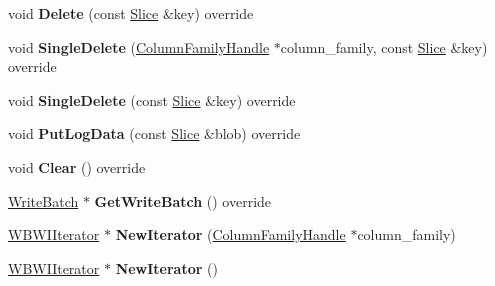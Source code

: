 \begin{DoxyCompactItemize}
\item 
void {\bfseries Delete} (const \hyperlink{classrocksdb_1_1Slice}{Slice} \&key) override\hypertarget{classrocksdb_1_1WriteBatchWithIndex_a8607c3d398eb4be3ecc0b146aa49c414}{}\label{classrocksdb_1_1WriteBatchWithIndex_a8607c3d398eb4be3ecc0b146aa49c414}

\item 
void {\bfseries Single\+Delete} (\hyperlink{classrocksdb_1_1ColumnFamilyHandle}{Column\+Family\+Handle} $\ast$column\+\_\+family, const \hyperlink{classrocksdb_1_1Slice}{Slice} \&key) override\hypertarget{classrocksdb_1_1WriteBatchWithIndex_a0f9e13dde1b941d9048e23a025748e94}{}\label{classrocksdb_1_1WriteBatchWithIndex_a0f9e13dde1b941d9048e23a025748e94}

\item 
void {\bfseries Single\+Delete} (const \hyperlink{classrocksdb_1_1Slice}{Slice} \&key) override\hypertarget{classrocksdb_1_1WriteBatchWithIndex_a5a6a99382308e325ba2331a41a27fec6}{}\label{classrocksdb_1_1WriteBatchWithIndex_a5a6a99382308e325ba2331a41a27fec6}

\item 
void {\bfseries Put\+Log\+Data} (const \hyperlink{classrocksdb_1_1Slice}{Slice} \&blob) override\hypertarget{classrocksdb_1_1WriteBatchWithIndex_a243f29744cb3521f987eb2da0405eff9}{}\label{classrocksdb_1_1WriteBatchWithIndex_a243f29744cb3521f987eb2da0405eff9}

\item 
void {\bfseries Clear} () override\hypertarget{classrocksdb_1_1WriteBatchWithIndex_a35c2f169d06c3965a30b8612640df8d8}{}\label{classrocksdb_1_1WriteBatchWithIndex_a35c2f169d06c3965a30b8612640df8d8}

\item 
\hyperlink{classrocksdb_1_1WriteBatch}{Write\+Batch} $\ast$ {\bfseries Get\+Write\+Batch} () override\hypertarget{classrocksdb_1_1WriteBatchWithIndex_a0e1a019e009b31c5a25388c4dc7ebfdc}{}\label{classrocksdb_1_1WriteBatchWithIndex_a0e1a019e009b31c5a25388c4dc7ebfdc}

\item 
\hyperlink{classrocksdb_1_1WBWIIterator}{W\+B\+W\+I\+Iterator} $\ast$ {\bfseries New\+Iterator} (\hyperlink{classrocksdb_1_1ColumnFamilyHandle}{Column\+Family\+Handle} $\ast$column\+\_\+family)\hypertarget{classrocksdb_1_1WriteBatchWithIndex_a78b9a2d037cbfc2c5410cda78551ffd3}{}\label{classrocksdb_1_1WriteBatchWithIndex_a78b9a2d037cbfc2c5410cda78551ffd3}

\item 
\hyperlink{classrocksdb_1_1WBWIIterator}{W\+B\+W\+I\+Iterator} $\ast$ {\bfseries New\+Iterator} ()\hypertarget{classrocksdb_1_1WriteBatchWithIndex_ab79deb71fb0f8899d68d2098df057416}{}\label{classrocksdb_1_1WriteBatchWithIndex_ab79deb71fb0f8899d68d2098df057416}


\end{DoxyCompactItemize}
